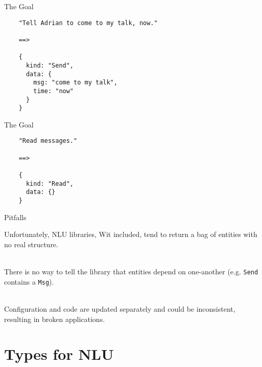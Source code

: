 \documentclass[10pt]{beamer}
\begin{document}
\begin{frame}[fragile]{The Goal}

  \begin{center}
    \begin{verbatim}
    "Tell Adrian to come to my talk, now."

    ==>

    {
      kind: "Send",
      data: {
        msg: "come to my talk",
        time: "now"
      }
    }
    \end{verbatim}
  \end{center}
\end{frame}

\begin{frame}[fragile]{The Goal}

  \begin{center}
    \begin{verbatim}
    "Read messages."

    ==>

    {
      kind: "Read",
      data: {}
    }
    \end{verbatim}
  \end{center}
\end{frame}

\begin{frame}[fragile]{Pitfalls}

  Unfortunately, NLU libraries, Wit included, tend to return a bag of entities
  with no real structure.

  ~\\
  There is no way to tell the library that entities depend on one-another (e.g.
  \verb|Send| contains a \verb|Msg|).

  ~\\
  Configuration and code are updated separately and could be inconsistent,
  resulting in broken applications.
\end{frame}

\section{Types for NLU}
\end{document}
